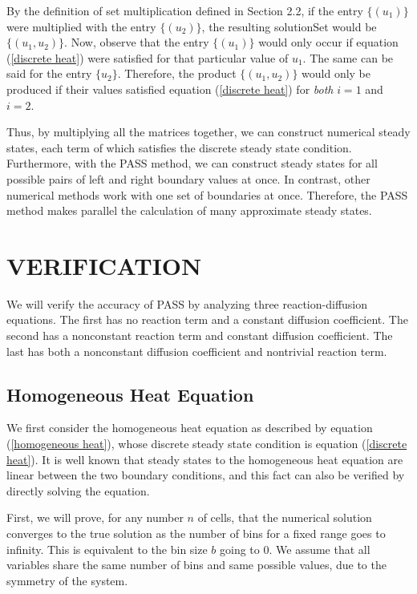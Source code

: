 \documentclass{article}
\begin{document}
By the definition of set multiplication defined in Section 2.2, if the entry $\{(u_1)\}$ were multiplied with the entry $\{(u_2)\}$, the resulting solutionSet would be $\{(u_1, u_2)\}$. Now, observe that the entry $\{(u_1)\}$ would only occur if equation (\ref{discrete heat}) were satisfied for that particular value of $u_1$. The same can be said for the entry $\{u_2\}$. Therefore, the product $\{(u_1, u_2)\}$ would only be produced if their values satisfied equation (\ref{discrete heat}) for \textit{both} $i = 1$ and $i = 2$.

Thus, by multiplying all the matrices together, we can construct numerical steady states, each term of which satisfies the discrete steady state condition. Furthermore, with the PASS method, we can construct steady states for all possible pairs of left and right boundary values at once. In contrast, other numerical methods work with one set of boundaries at once. Therefore, the PASS method makes parallel the calculation of many approximate steady states.

\section{VERIFICATION}

We will verify the accuracy of PASS by analyzing three reaction-diffusion equations. The first has no reaction term and a constant diffusion coefficient. The second has a nonconstant reaction term and constant diffusion coefficient. The last has both a nonconstant diffusion coefficient and nontrivial reaction term.

\subsection{Homogeneous Heat Equation}

We first consider the homogeneous heat equation as described by equation (\ref{homogeneous heat}), whose discrete steady state condition is equation (\ref{discrete heat}). It is well known that steady states to the homogeneous heat equation are linear between the two boundary conditions, and this fact can also be verified by directly solving the equation.

First, we will prove, for any number $n$ of cells, that the numerical solution converges to the true solution as the number of bins for a fixed range goes to infinity. This is equivalent to the bin size $b$ going to 0. We assume that all variables share the same number of bins and same possible values, due to the symmetry of the system.
\end{document}
